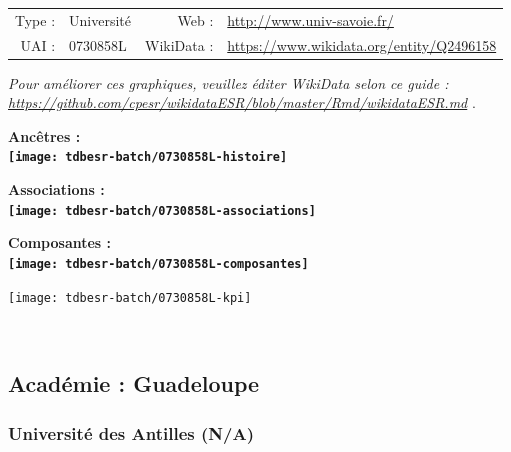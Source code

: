 \documentclass[12pt,french,]{article}
\begin{document}
\begin{tabular*}{\textwidth}{rp{5cm}rl}  
\hline  
Type : & Université & Web : &\href{http://www.univ-savoie.fr/}{http://www.univ-savoie.fr/} \\  
UAI : & 0730858L & WikiData : & \href{https://www.wikidata.org/entity/Q2496158}{https://www.wikidata.org/entity/Q2496158} \\  
\hline  
\end{tabular*}

\textit{\scriptsize Pour améliorer ces graphiques, veuillez éditer WikiData selon ce guide :  \href{https://github.com/cpesr/wikidataESR/blob/master/Rmd/wikidataESR.md}{https://github.com/cpesr/wikidataESR/blob/master/Rmd/wikidataESR.md}}
.

\vspace{1cm}  
\begin{minipage}[b]{0.50\textwidth}\begin{center} \bf Ancêtres : \\  
\texttt{[image: tdbesr-batch/0730858L-histoire]} \end{center}\end{minipage}\begin{minipage}[b]{0.50\textwidth}\begin{center} \bf Associations : \\  
\texttt{[image: tdbesr-batch/0730858L-associations]} \end{center}\end{minipage}

\hrulefill

\begin{center} \bf Composantes : \\  
\texttt{[image: tdbesr-batch/0730858L-composantes]} \end{center}

\begin{center}\texttt{[image: tdbesr-batch/0730858L-kpi]} \end{center}\checkoddpage

\ifoddpage \fi ~\newpage  

\hypertarget{acaduxe9mie-guadeloupe}{%
\subsection{Académie : Guadeloupe}\label{acaduxe9mie-guadeloupe}}

\hypertarget{universituxe9-des-antilles-na}{%
\subsubsection{Université des Antilles
(N/A)}\label{universituxe9-des-antilles-na}}
\end{document}

